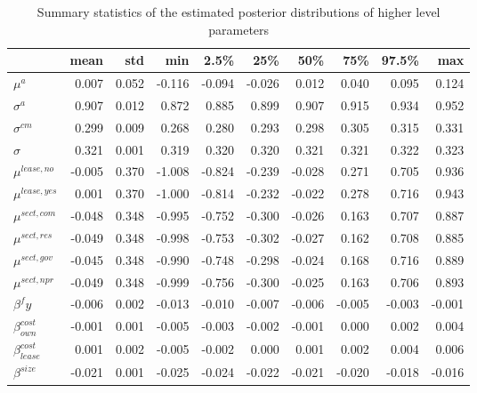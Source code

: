 \documentclass[a4paper]{article}
\begin{document}
\begin{table}
  \begin{tabular}{lrrrrrrrrr}
  \toprule
  {} &    mean &    std &     min &    2.5\% &     25\% &     50\% &     75\% &   97.5\% &     max \\
  \midrule
  $\mu^a$     &  0.007 & 0.052 & -0.116 & -0.094 & -0.026 &  0.012 &  0.040 &  0.095 &  0.124 \\
$\sigma^a$   &  0.907 & 0.012 &  0.872 &  0.885 &  0.899 &  0.907 &  0.915 &  0.934 &  0.952 \\
$\sigma^{cm} $  &  0.299 & 0.009 &  0.268 &  0.280 &  0.293 &  0.298 &  0.305 &  0.315 &  0.331 \\
$\sigma$     &  0.321 & 0.001 &  0.319 &  0.320 &  0.320 &  0.321 &  0.321 &  0.322 &  0.323 \\
$\mu^{lease, no} $ & -0.005 & 0.370 & -1.008 & -0.824 & -0.239 & -0.028 &  0.271 &  0.705 &  0.936 \\
$\mu^{lease, yes}$  &  0.001 & 0.370 & -1.000 & -0.814 & -0.232 & -0.022 &  0.278 &  0.716 &  0.943 \\
$\mu^{sect, com}$      & -0.048 & 0.348 & -0.995 & -0.752 & -0.300 & -0.026 &  0.163 &  0.707 &  0.887 \\
$\mu^{sect, res} $     & -0.049 & 0.348 & -0.998 & -0.753 & -0.302 & -0.027 &  0.162 &  0.708 &  0.885 \\
$\mu^{sect, gov} $    & -0.045 & 0.348 & -0.990 & -0.748 & -0.298 & -0.024 &  0.168 &  0.716 &  0.889 \\
$\mu^{sect, npr}$      & -0.049 & 0.348 & -0.999 & -0.756 & -0.300 & -0.025 &  0.163 &  0.706 &  0.893 \\
$\beta^fy$   & -0.006 & 0.002 & -0.013 & -0.010 & -0.007 & -0.006 & -0.005 & -0.003 & -0.001 \\
$\beta_{own}^{cost}$ & -0.001 & 0.001 & -0.005 & -0.003 & -0.002 & -0.001 &  0.000 &  0.002 &  0.004 \\
$\beta_{lease}^{cost}$ &  0.001 & 0.002 & -0.005 & -0.002 &  0.000 &  0.001 &  0.002 &  0.004 &  0.006 \\
$\beta^{size}$ & -0.021 & 0.001 & -0.025 & -0.024 & -0.022 & -0.021 & -0.020 & -0.018 & -0.016 \\
  \bottomrule
  \end{tabular}
\caption{\label{table:higher_level_params} Summary statistics of the estimated posterior distributions of higher level parameters}
\end{table}

\end{document}
